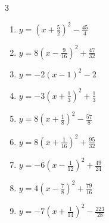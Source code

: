 \begin{multicols}{3}
\begin{enumerate}

  \item $\displaystyle y=\left( x+\frac{5}{2}\right)^{2}-\frac{45}{4}$


  \item $\displaystyle y=8\left( x-\frac{9}{16}\right)^{2}+\frac{47}{32}$


  \item $\displaystyle y=-2\left( x-1\right)^{2}-2$

        \phantom{$\displaystyle 頂点\left( 1 , -2 \right)$}

  \item $\displaystyle y=-3\left( x+\frac{1}{3}\right)^{2}+\frac{1}{3}$


\columnbreak %

\resetques

  \item $\displaystyle y=8\left( x+\frac{1}{8}\right)^{2}-\frac{57}{8}$


  \item $\displaystyle y=8\left( x+\frac{1}{16}\right)^{2}+\frac{95}{32}$


  \item $\displaystyle y=-6\left( x-\frac{1}{12}\right)^{2}+\frac{49}{24}$


  \item $\displaystyle y=4\left( x-\frac{7}{8}\right)^{2}+\frac{79}{16}$


  \item $\displaystyle y=-7\left( x+\frac{1}{14}\right)^{2}-\frac{223}{28}$



\end{enumerate}
\end{multicols}

